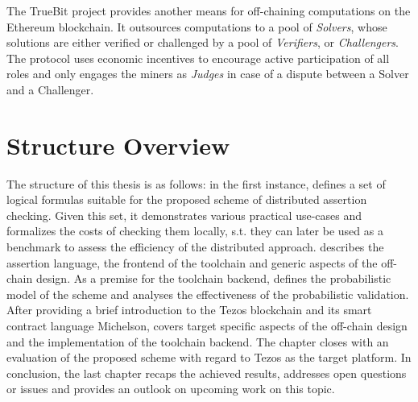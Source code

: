 The TrueBit \cite{teutsch_truebit} project provides another means for off-chaining computations on the Ethereum blockchain. It outsources computations to a pool of \textit{Solvers}, whose solutions are either verified or challenged by a pool of \textit{Verifiers}, or \textit{Challengers}. The protocol uses economic incentives to encourage active participation of all roles and only engages the miners as \textit{Judges} in case of a dispute between a Solver and a Challenger. 

\section{Structure Overview}
The structure of this thesis is as follows: in the first instance,  defines a set of logical formulas suitable for the proposed scheme of distributed assertion checking. Given this set, it demonstrates various practical use-cases  and formalizes the costs of checking them locally, s.t. they can later be used as a benchmark to assess the efficiency of the distributed approach.  describes the assertion language, the frontend of the toolchain and generic aspects of the off-chain design. As a premise for the toolchain backend,  defines the probabilistic model of the scheme and analyses the effectiveness of the probabilistic validation. After providing a brief introduction to the Tezos blockchain and its smart contract language Michelson,  covers target specific aspects of the off-chain design and the implementation of the toolchain backend. The chapter closes with an evaluation of the proposed scheme with regard to Tezos as the target platform. In conclusion, the last chapter recaps the achieved results, addresses open questions or issues and provides an outlook on upcoming work on this topic.